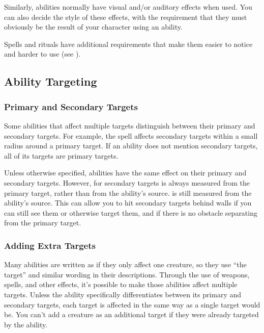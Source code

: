     Similarly, abilities normally have visual and/or auditory effects when used.
    You can also decide the style of these effects, with the requirement that they must obviously be the result of your character using an ability.

    Spells and rituals have additional requirements that make them easier to notice and harder to use (see ).

  \subsection{Ability Targeting}\label{Ability Targeting}

    \subsubsection{Primary and Secondary Targets}\label{Primary and Secondary Targets}
      Some abilities that affect multiple targets distinguish between their primary and secondary targets.
      For example, the  spell affects secondary targets within a small radius around a primary target.
      If an ability does not mention secondary targets, all of its targets are primary targets.

      Unless otherwise specified, abilities have the same effect on their primary and secondary targets.
      However,  for secondary targets is always measured from the primary target, rather than from the ability's source.
       is still measured from the ability's source.
      This can allow you to hit secondary targets behind walls if you can still see them or otherwise target them, and if there is no obstacle separating from the primary target.

    \subsubsection{Adding Extra Targets}
      Many abilities are written as if they only affect one creature, so they use ``the target'' and similar wording in their descriptions.
      Through the use of  weapons,  spells, and other effects, it's possible to make those abilities affect multiple targets.
      Unless the ability specifically differentiates between its primary and secondary targets, each target is affected in the same way as a single target would be.
      You can't add a creature as an additional target if they were already targeted by the ability.

